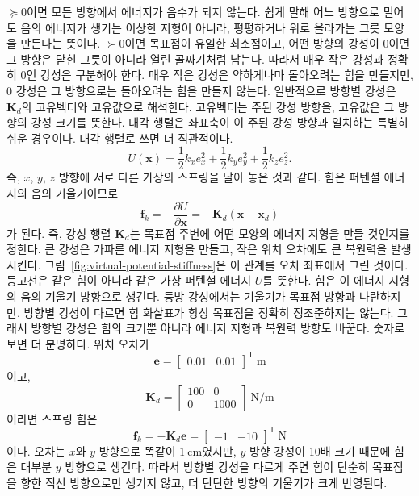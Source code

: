 $\succeq0$이면 모든 방향에서 에너지가 음수가 되지 않는다.
쉽게 말해 어느 방향으로 밀어도 음의 에너지가 생기는 이상한 지형이 아니라, 평평하거나 위로 올라가는 그릇 모양을 만든다는 뜻이다.
$\succ0$이면 목표점이 유일한 최소점이고, 어떤 방향의 강성이 0이면 그 방향은 닫힌 그릇이 아니라 열린 골짜기처럼 남는다.
따라서 매우 작은 강성과 정확히 0인 강성은 구분해야 한다.
매우 작은 강성은 약하게나마 돌아오려는 힘을 만들지만, 0 강성은 그 방향으로는 돌아오려는 힘을 만들지 않는다.
일반적으로 방향별 강성은 $\bm{K}_d$의 고유벡터와 고유값으로 해석한다.
고유벡터는 주된 강성 방향을, 고유값은 그 방향의 강성 크기를 뜻한다.
대각 행렬은 좌표축이 이 주된 강성 방향과 일치하는 특별히 쉬운 경우이다.
대각 행렬로 쓰면 더 직관적이다.
\begin{equation}
  U(\bm{x})
  =
  \frac{1}{2}k_x e_x^2
  +
  \frac{1}{2}k_y e_y^2
  +
  \frac{1}{2}k_z e_z^2.
\end{equation}
즉, $x$, $y$, $z$ 방향에 서로 다른 가상의 스프링을 달아 놓은 것과 같다.
힘은 퍼텐셜 에너지의 음의 기울기이므로
\begin{equation}
  \bm{f}_k
  =
  -\frac{\partial U}{\partial \bm{x}}
  =
  -\bm{K}_d(\bm{x}-\bm{x}_d)
\end{equation}
가 된다.
즉, 강성 행렬 $\bm{K}_d$는 목표점 주변에 어떤 모양의 에너지 지형을 만들 것인지를 정한다.
큰 강성은 가파른 에너지 지형을 만들고, 작은 위치 오차에도 큰 복원력을 발생시킨다.
그림~\ref{fig:virtual-potential-stiffness}은 이 관계를 오차 좌표에서 그린 것이다.
등고선은 같은 힘이 아니라 같은 가상 퍼텐셜 에너지 $U$를 뜻한다.
힘은 이 에너지 지형의 음의 기울기 방향으로 생긴다.
등방 강성에서는 기울기가 목표점 방향과 나란하지만, 방향별 강성이 다르면 힘 화살표가 항상 목표점을 정확히 정조준하지는 않는다.
그래서 방향별 강성은 힘의 크기뿐 아니라 에너지 지형과 복원력 방향도 바꾼다.
숫자로 보면 더 분명하다.
위치 오차가
\begin{equation}
  \bm{e}
  =
  \begin{bmatrix}
  0.01 & 0.01
  \end{bmatrix}^{\mathsf{T}}~\mathrm{m}
\end{equation}
이고,
\begin{equation}
  \bm{K}_d
  =
  \begin{bmatrix}
  100 & 0 \\
  0 & 1000
  \end{bmatrix}
  ~\mathrm{N/m}
\end{equation}
이라면 스프링 힘은
\begin{equation}
  \bm{f}_k
  =
  -\bm{K}_d\bm{e}
  =
  \begin{bmatrix}
  -1 & -10
  \end{bmatrix}^{\mathsf{T}}~\mathrm{N}
\end{equation}
이다.
오차는 $x$와 $y$ 방향으로 똑같이 $1~\mathrm{cm}$였지만, $y$ 방향 강성이 10배 크기 때문에 힘은 대부분 $y$ 방향으로 생긴다.
따라서 방향별 강성을 다르게 주면 힘이 단순히 목표점을 향한 직선 방향으로만 생기지 않고, 더 단단한 방향의 기울기가 크게 반영된다.

